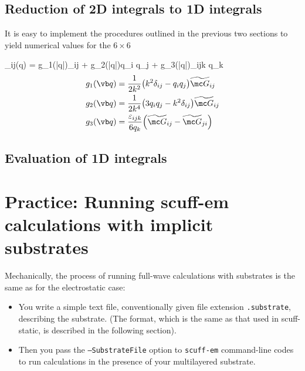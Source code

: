 \documentclass[letterpaper]{article}
\renewcommand{\wt}{\widetilde}
\begin{document}
\newpage
\subsection{Reduction of 2D integrals to 1D integrals}
\label{TwoDToOneDSection}

It is easy to implement the procedures outlined in the previous
two sections to yield numerical values for the $6\times 6$

{ \wt{\mc G}_{ij}(\vb q)
  =   g_1(|\vb q|)\delta_{ij}
    + g_2(|\vb q|)q_i q_j
    + g_3(|\vb q|)\varepsilon_{ijk} q_k
}
\begin{align*}
g_1(\vb q)
&= \frac{1}{2k^2} \big( k^2 \delta_{ij} - q_i q_j \big)\wt{\mc G}_{ij}
\\
g_2(\vb q)
&= \frac{1}{2k^4} \big( 3q_i q_j - k^2 \delta_{ij}\big)\wt{\mc G}_{ij}
\\
g_3(\vb q)
&= \frac{\varepsilon_{ijk}}{6q_k}\Big( \wt{\mc G}_{ij} - \wt{\mc G}_{ji} \Big)
\end{align*}

\subsection{Evaluation of 1D integrals}
\label{OneDIntegralSection}


\newpage  
\section{Practice: Running {\sc scuff-em} calculations
         with implicit substrates}
\label{MechanicsSection}
 
Mechanically, the process of running full-wave calculations
with substrates is the same as for the electrostatic case:

\begin{itemize}
  \item You write a simple text file, conventionally given
        file extension \texttt{.substrate}, describing the
        substrate. (The format, which is the same as that
        used in {\sc scuff-static}, is described in the 
        following section).
  \item Then you pass the \texttt{--SubstrateFile} option to
        \texttt{scuff-em} command-line codes to run calculations
        in the presence of your multilayered substrate.
\end{itemize}
\end{document}
